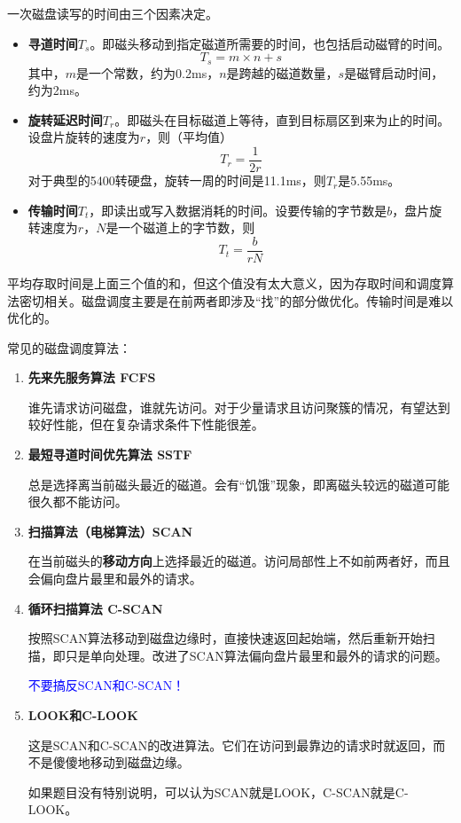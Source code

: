 \documentclass[12pt, a4paper, oneside]{ctexart}
\begin{document}
一次磁盘读写的时间由三个因素决定。
\begin{itemize}
  \item {\bf 寻道时间$T_s$}。即磁头移动到指定磁道所需要的时间，也包括启动磁臂的时间。
  \begin{equation*}
    T_s=m\times n+s
  \end{equation*}
  其中，$m$是一个常数，约为0.2ms，$n$是跨越的磁道数量，$s$是磁臂启动时间，约为2ms。

  \item {\bf 旋转延迟时间$T_r$}。即磁头在目标磁道上等待，直到目标扇区到来为止的时间。设盘片旋转的速度为$r$，则（平均值）
  \begin{equation*}
    T_r=\frac{1}{2r}
  \end{equation*}
  对于典型的5400转硬盘，旋转一周的时间是11.1ms，则$T_r$是5.55ms。

  \item {\bf 传输时间$T_t$}，即读出或写入数据消耗的时间。设要传输的字节数是$b$，盘片旋转速度为$r$，$N$是一个磁道上的字节数，则
  \begin{equation*}
    T_t=\frac{b}{rN}
  \end{equation*}
\end{itemize}

平均存取时间是上面三个值的和，但这个值没有太大意义，因为存取时间和调度算法密切相关。磁盘调度主要是在前两者即涉及“找”的部分做优化。传输时间是难以优化的。

常见的磁盘调度算法：
\begin{enumerate}
  \item {\bf 先来先服务算法 FCFS}
  
  谁先请求访问磁盘，谁就先访问。对于少量请求且访问聚簇的情况，有望达到较好性能，但在复杂请求条件下性能很差。

  \item {\bf 最短寻道时间优先算法 SSTF}
  
  总是选择离当前磁头最近的磁道。会有“饥饿”现象，即离磁头较远的磁道可能很久都不能访问。

  \item {\bf 扫描算法（电梯算法）SCAN}
  
  在当前磁头的\textbf{移动方向}上选择最近的磁道。访问局部性上不如前两者好，而且会偏向盘片最里和最外的请求。

  \item {\bf 循环扫描算法 C-SCAN}
  
  按照SCAN算法移动到磁盘边缘时，直接快速返回起始端，然后重新开始扫描，即只是单向处理。改进了SCAN算法偏向盘片最里和最外的请求的问题。

  \textcolor{blue}{不要搞反SCAN和C-SCAN！}
  \item {\bf LOOK和C-LOOK}
  
  这是SCAN和C-SCAN的改进算法。它们在访问到最靠边的请求时就返回，而不是傻傻地移动到磁盘边缘。

  如果题目没有特别说明，可以认为SCAN就是LOOK，C-SCAN就是C-LOOK。
\end{enumerate}
\end{document}
